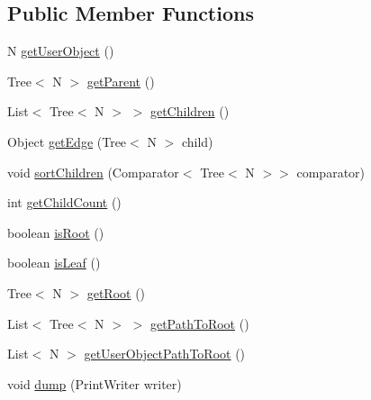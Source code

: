 \subsection*{Public Member Functions}
\begin{DoxyCompactItemize}
\item 
N \hyperlink{interfaceuk_1_1ac_1_1manchester_1_1cs_1_1bhig_1_1util_1_1_tree_3_01_n_01_4_a52f038f829efa0d87f22baab3be1d17d}{get\-User\-Object} ()
\item 
Tree$<$ N $>$ \hyperlink{interfaceuk_1_1ac_1_1manchester_1_1cs_1_1bhig_1_1util_1_1_tree_3_01_n_01_4_a27542c2dbe559b47928c8708e35660cd}{get\-Parent} ()
\item 
List$<$ Tree$<$ N $>$ $>$ \hyperlink{interfaceuk_1_1ac_1_1manchester_1_1cs_1_1bhig_1_1util_1_1_tree_3_01_n_01_4_a48ed9eeedd9b96a050910919fe952178}{get\-Children} ()
\item 
Object \hyperlink{interfaceuk_1_1ac_1_1manchester_1_1cs_1_1bhig_1_1util_1_1_tree_3_01_n_01_4_ad226272158f768b520714f2218635d56}{get\-Edge} (Tree$<$ N $>$ child)
\item 
void \hyperlink{interfaceuk_1_1ac_1_1manchester_1_1cs_1_1bhig_1_1util_1_1_tree_3_01_n_01_4_ab8fc39848ee3fcfaf07c86ee1712164a}{sort\-Children} (Comparator$<$ Tree$<$ N $>$$>$ comparator)
\item 
int \hyperlink{interfaceuk_1_1ac_1_1manchester_1_1cs_1_1bhig_1_1util_1_1_tree_3_01_n_01_4_a532b7efecad9774eef1e58f7f82a058a}{get\-Child\-Count} ()
\item 
boolean \hyperlink{interfaceuk_1_1ac_1_1manchester_1_1cs_1_1bhig_1_1util_1_1_tree_3_01_n_01_4_afd39891bbdc58526ebadcd44ac9b5419}{is\-Root} ()
\item 
boolean \hyperlink{interfaceuk_1_1ac_1_1manchester_1_1cs_1_1bhig_1_1util_1_1_tree_3_01_n_01_4_a009cef3986a8a9657b4e976c46f02890}{is\-Leaf} ()
\item 
Tree$<$ N $>$ \hyperlink{interfaceuk_1_1ac_1_1manchester_1_1cs_1_1bhig_1_1util_1_1_tree_3_01_n_01_4_a52bdb883883b40ed4ef0530147d407b6}{get\-Root} ()
\item 
List$<$ Tree$<$ N $>$ $>$ \hyperlink{interfaceuk_1_1ac_1_1manchester_1_1cs_1_1bhig_1_1util_1_1_tree_3_01_n_01_4_a9118d05614f6855eb42a3c0466bc4b9e}{get\-Path\-To\-Root} ()
\item 
List$<$ N $>$ \hyperlink{interfaceuk_1_1ac_1_1manchester_1_1cs_1_1bhig_1_1util_1_1_tree_3_01_n_01_4_a649410090cc50412e7b4cdde0d6dff67}{get\-User\-Object\-Path\-To\-Root} ()
\item 
void \hyperlink{interfaceuk_1_1ac_1_1manchester_1_1cs_1_1bhig_1_1util_1_1_tree_3_01_n_01_4_ad9a0175b650d7df95d0d69e72f528608}{dump} (Print\-Writer writer)
$$
\end{DoxyCompactItemize}
